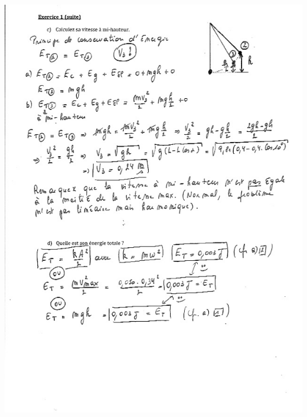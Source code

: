 \includegraphics[width=17.498cm,height=23.941cm]{Pictures/1000000100000264000003450C3A378F8D932159.png}

